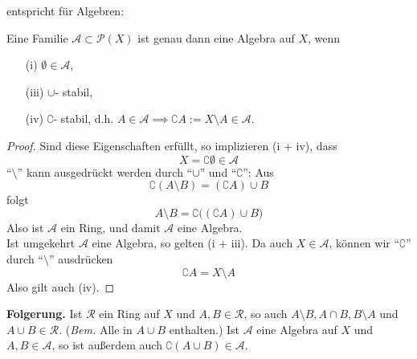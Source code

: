 entspricht für Algebren:
\begin{lemma}
\begin{mdframed}
Eine Familie $\mathcal{A} \subset \mathcal{P}(X)$ ist genau dann eine Algebra auf $X$, wenn
\begin{enumerate}[topsep=3pt, itemsep=0pt]
\item[(i)] $\emptyset \in \mathcal{A}$,
\item[(iii)] $\cup$- stabil,
\item[(iv)] $\complement$- stabil, d.h. $A \in \mathcal{A} \implies \complement A := X\setminus A \in \mathcal{A}$.
\end{enumerate}
\end{mdframed}
\begin{proof}
Sind diese Eigenschaften erfüllt, so implizieren (i + iv), dass
\begin{equation*}
X = \complement \emptyset \in \mathcal{A}
\end{equation*}
``$\setminus$'' kann ausgedrückt werden durch ``$\cup$'' und ``$\complement$'': Aus
\begin{equation*}
\complement (A \setminus B) = (\complement A) \cup B
\end{equation*}
folgt
\begin{equation*}
A \setminus B = \complement \big( (\complement A) \cup B \big)
\end{equation*}
Also ist $\mathcal{A}$ ein Ring, und damit $\mathcal{A}$ eine Algebra. \\
Ist umgekehrt $\mathcal{A}$ eine Algebra, so gelten (i + iii). Da auch $X \in \mathcal{A}$, können wir ``$\complement$'' durch ``$\setminus$'' ausdrücken
\begin{equation*}
\complement A = X \setminus A
\end{equation*}
Also gilt auch (iv).
\end{proof}
\end{lemma}
\textbf{Folgerung.} Ist $\mathcal{R}$ ein Ring auf $X$ und $A,B \in \mathcal{R}$, so auch $A\setminus B, A\cap B, B\setminus A$ und $A\cup B \in \mathcal{R}$. (\textit{Bem.} Alle in $A\cup B$ enthalten.) Ist $\mathcal{A}$ eine Algebra auf $X$ und $A,B \in \mathcal{A}$, so ist außerdem auch $\complement (A \cup B) \in \mathcal{A}$.

